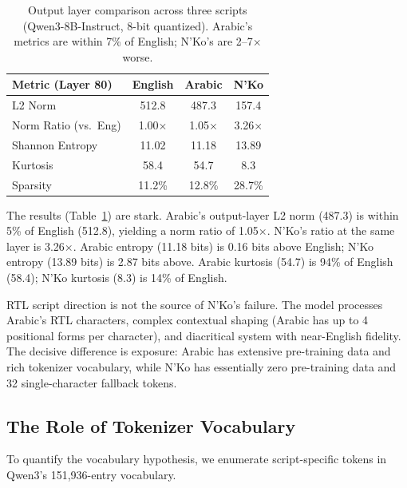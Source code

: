\documentclass[11pt]{article}
\begin{document}
\begin{table}[t]
\centering
\small
\begin{tabular}{lccc}
\toprule
\textbf{Metric (Layer 80)} & \textbf{English} & \textbf{Arabic} & \textbf{N'Ko} \\
\midrule
L2 Norm & 512.8 & 487.3 & 157.4 \\
Norm Ratio (vs.\ Eng) & 1.00$\times$ & 1.05$\times$ & 3.26$\times$ \\
Shannon Entropy & 11.02 & 11.18 & 13.89 \\
Kurtosis & 58.4 & 54.7 & 8.3 \\
Sparsity & 11.2\% & 12.8\% & 28.7\% \\
\bottomrule
\end{tabular}
\caption{Output layer comparison across three scripts (Qwen3-8B-Instruct, 8-bit quantized). Arabic's metrics are within 7\% of English; N'Ko's are 2--7$\times$ worse.}
\label{tab:arabic-comparison}
\end{table}

The results (Table~\ref{tab:arabic-comparison}) are stark.
Arabic's output-layer L2 norm (487.3) is within 5\% of English (512.8), yielding a norm ratio of 1.05$\times$.
N'Ko's ratio at the same layer is 3.26$\times$.
Arabic entropy (11.18 bits) is 0.16 bits above English; N'Ko entropy (13.89 bits) is 2.87 bits above.
Arabic kurtosis (54.7) is 94\% of English (58.4); N'Ko kurtosis (8.3) is 14\% of English.

RTL script direction is not the source of N'Ko's failure.
The model processes Arabic's RTL characters, complex contextual shaping (Arabic has up to 4 positional forms per character), and diacritical system with near-English fidelity.
The decisive difference is exposure: Arabic has extensive pre-training data and rich tokenizer vocabulary, while N'Ko has essentially zero pre-training data and 32 single-character fallback tokens.

\subsection{The Role of Tokenizer Vocabulary}

To quantify the vocabulary hypothesis, we enumerate script-specific tokens in Qwen3's 151,936-entry vocabulary.
\end{document}
